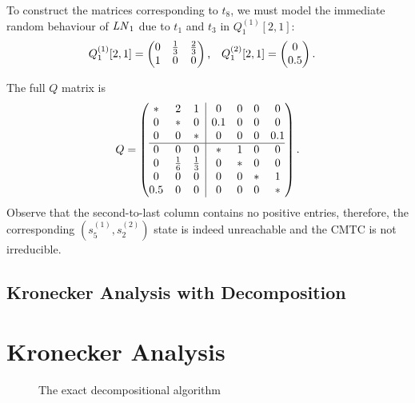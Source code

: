 \documentclass[a4paper,10pt,twoside,openright]{memoir}
\newcommand*{\LN}{\textnormal{\emph{LN}}}
\begin{document}
To construct the matrices corresponding to $t_8$, we must model the
immediate random behaviour of $\LN_1$ due to $t_1$ and $t_3$ in
$Q^{(1)}_1[2, 1]$:
\begin{align}
  Q^{(1)}_1[2, 1] &= \begin{pmatrix}
    0 & \frac{1}{3} & \frac{2}{3} \\
    1 & 0 & 0
  \end{pmatrix} \text, &
  Q^{(2)}_1[2, 1] &= \begin{pmatrix}
    0 \\
    0.5
  \end{pmatrix} \text.
\end{align}

The full $Q$ matrix is
\begin{equation}
  Q = \left( \begin{array}{@{}ccc|cccc@{}}
               * & 2 & 1 & 0 & 0 & 0 & 0 \\
               0 & * & 0 & 0.1 & 0 & 0 & 0 \\
               0 & 0 & * & 0 & 0 & 0 & 0.1 \\
               \hline
               0 & 0 & 0 & * & 1 & 0 & 0 \\
               0 & \frac{1}{6} & \frac{1}{3} & 0 & * & 0 & 0 \\
               0 & 0 & 0 & 0 & 0 & * & 1 \\
               0.5 & 0 & 0 & 0 & 0 & 0 & * \\
             \end{array} \right) \text.
\end{equation}
Observe that the second-to-last column contains no positive entries,
therefore, the corresponding $(s^{(1)}_5, s^{(2)}_2)$ state is indeed
unreachable and the CMTC is not irreducible.

\section{Kronecker Analysis with Decomposition}

\chapter{Kronecker Analysis}

\begin{figure}
  {\centering
    
    \par}
  \caption{The exact decompositional algorithm}
  \label{fig:kronecker:flowchart}
\end{figure}
\end{document}
